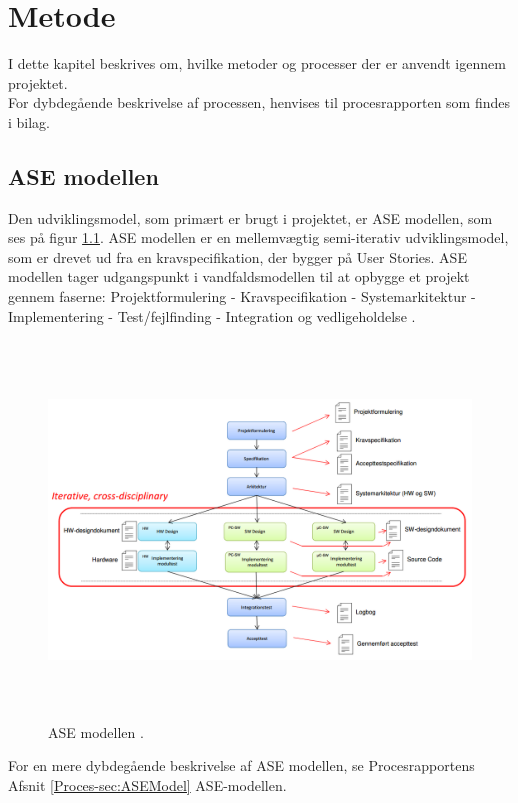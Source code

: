 \chapter{Metode}
I dette kapitel beskrives om, hvilke metoder og processer der er anvendt igennem projektet. \\
For dybdegående beskrivelse af processen, henvises til procesrapporten som findes i bilag.

\section{ASE modellen}
Den udviklingsmodel, som primært er brugt i projektet, er ASE modellen, som ses på figur \ref{fig:ASE}. ASE modellen\cite{ASE} er en mellemvægtig semi-iterativ udviklingsmodel, som er drevet ud fra en kravspecifikation, der bygger på User Stories. ASE modellen tager udgangspunkt i vandfaldsmodellen til at opbygge et projekt gennem faserne: Projektformulering - Kravspecifikation - Systemarkitektur -  Implementering -  Test/fejlfinding -  Integration og vedligeholdelse \cite{ASE}.

\begin{figure} [!ht]
	\begin{center}
		\includegraphics[height=10cm, width=12cm]{Metode/ASEModellen}
	\end{center}
	\caption{ASE modellen \cite{ASE}.}
	\label{fig:ASE}
\end{figure}

For en mere dybdegående beskrivelse af ASE modellen, se Procesrapportens Afsnit \ref{Proces-sec:ASEModel} ASE-modellen. \\

